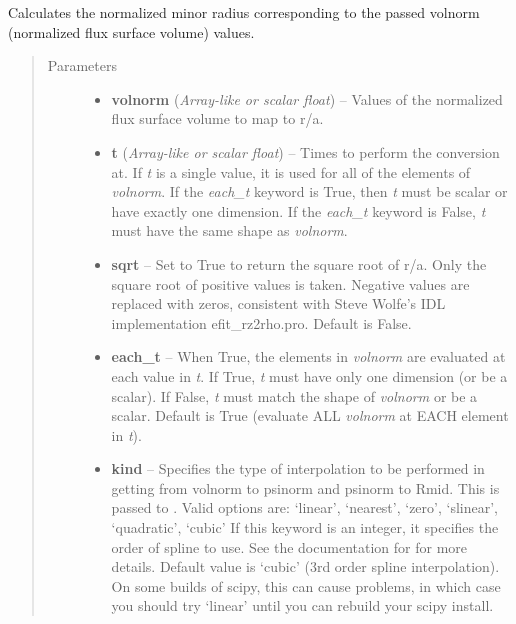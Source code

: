 \documentclass[letterpaper,10pt,english]{sphinxmanual}
\begin{document}
\begin{fulllineitems}
\begin{fulllineitems}
\end{fulllineitems}


\begin{fulllineitems}
\label{eqtools:eqtools.core.Equilibrium.volnorm2roa}
Calculates the normalized minor radius corresponding to the passed volnorm (normalized flux surface volume) values.
\begin{quote}\begin{description}
\item[{Parameters}] \leavevmode\begin{itemize}
\item {} 
\textbf{volnorm} (\emph{Array-like or scalar float}) -- Values of the normalized
flux surface volume to map to r/a.

\item {} 
\textbf{t} (\emph{Array-like or scalar float}) -- Times to perform the conversion at.
If \emph{t} is a single value, it is used for all of the elements of
\emph{volnorm}. If the \emph{each\_t} keyword is True, then \emph{t} must be scalar
or have exactly one dimension. If the \emph{each\_t} keyword is False,
\emph{t} must have the same shape as \emph{volnorm}.

\item {} 
\textbf{sqrt} -- Set to True to return the square root of r/a.
Only the square root of positive values is taken. Negative
values are replaced with zeros, consistent with Steve Wolfe's
IDL implementation efit\_rz2rho.pro. Default is False.

\item {} 
\textbf{each\_t} -- When True, the elements in \emph{volnorm} are evaluated
at each value in \emph{t}. If True, \emph{t} must have only one dimension
(or be a scalar). If False, \emph{t} must match the shape of \emph{volnorm}
or be a scalar. Default is True (evaluate ALL \emph{volnorm} at EACH
element in \emph{t}).

\item {} 
\textbf{kind} -- Specifies the type of
interpolation to be performed in getting from volnorm to
psinorm and psinorm to Rmid. This is passed to
. Valid options are:
`linear', `nearest', `zero', `slinear', `quadratic', `cubic'
If this keyword is an integer, it specifies the order of spline
to use. See the documentation for  for more
details. Default value is `cubic' (3rd order spline
interpolation). On some builds of scipy, this can cause problems,
in which case you should try `linear' until you can rebuild your
scipy install.


\end{itemize}
\end{description}
\end{quote}
\end{fulllineitems}
\end{fulllineitems}
\end{document}
